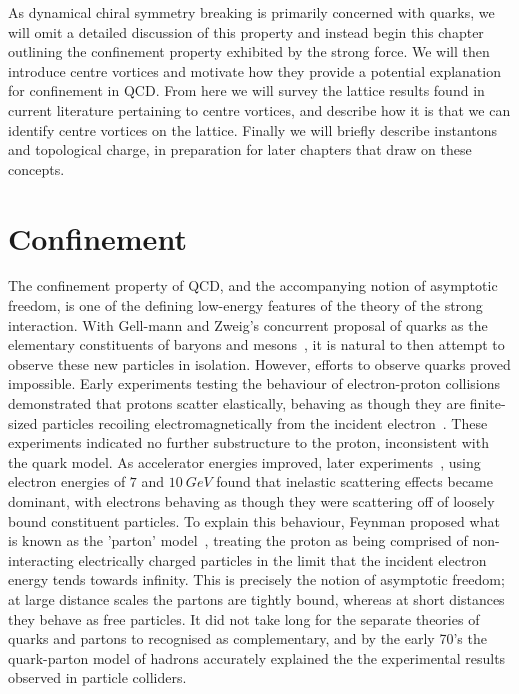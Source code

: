 As dynamical chiral symmetry breaking is primarily concerned with quarks, we will omit a detailed discussion of this property and instead begin this chapter outlining the confinement property exhibited by the strong force. We will then introduce centre vortices and motivate how they provide a potential explanation for confinement in QCD. From here we will survey the lattice results found in current literature pertaining to centre vortices, and describe how it is that we can identify centre vortices on the lattice. Finally we will briefly describe instantons and topological charge, in preparation for later chapters that draw on these concepts.  
\section{Confinement}\label{sec:Confinement}
The confinement property of QCD, and the accompanying notion of asymptotic freedom, is one of the defining low-energy features of the theory of the strong interaction. With Gell-mann and Zweig's concurrent proposal of quarks as the elementary constituents of baryons and mesons~\cite{GellMann:1964nj,Zweig:1964jf}, it is natural to then attempt to observe these new particles in isolation. However, efforts to observe quarks proved impossible. Early experiments testing the behaviour of electron-proton collisions demonstrated that protons scatter elastically, behaving as though they are finite-sized particles recoiling electromagnetically from the incident electron~\cite{Hofstadter:1956qs}. These experiments indicated no further substructure to the proton, inconsistent with the quark model. As accelerator energies improved, later experiments~\cite{Bloom:1969kc, Breidenbach:1969kd}, using electron energies of $7$ and $10~\si{GeV}$ found that inelastic scattering effects became dominant, with electrons behaving as though they were scattering off of loosely bound constituent particles. To explain this behaviour, Feynman proposed what is known as the 'parton' model~\cite{Feynman:1969ej}, treating the proton as being comprised of non-interacting electrically charged particles in the limit that the incident electron energy tends towards infinity. This is precisely the notion of asymptotic freedom; at large distance scales the partons are tightly bound, whereas at short distances they behave as free particles. It did not take long for the separate theories of quarks and partons to recognised as complementary, and by the early 70's the quark-parton model of hadrons accurately explained the the experimental results observed in particle colliders.\\

